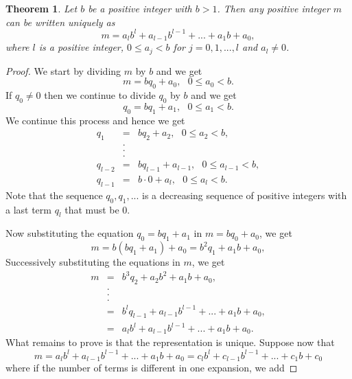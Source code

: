 \documentclass[12pt,letterpaper]{book}
\newtheorem{theorem}{Theorem}
\begin{document}
\begin{theorem} \label{base}
Let $b$ be a positive integer with $b>1$.  Then any positive integer
$m$ can be written uniquely as
\begin{equation*}
m=a_lb^l+a_{l-1}b^{l-1}+...+a_1b+a_0,
\end{equation*}
where $l$ is a positive integer, $0\leq a_j<b$ for $j=0,1,...,l$ and
$a_l\neq 0$.
\end{theorem}
\begin{proof}
We start by dividing $m$ by $b$ and we get
\begin{equation*}
m=bq_0+a_0, \ \ \ 0\leq a_0 <b.
\end{equation*}
If $q_0\neq 0$ then we continue to divide $q_0$ by $b$ and we get
\begin{equation*}
q_0=bq_1+a_1, \ \ \ 0\leq a_1<b.
\end{equation*}
We continue this process and hence we get
\begin{eqnarray*}
q_1&=&bq_2+a_2, \ \ \  0\leq a_2<b,\\
&.&\\
&.&\\
&.&\\
q_{l-2}&=&bq_{l-1}+a_{l-1}, \ \ \ 0\leq a_{l-1}<b,\\
q_{l-1}&=&b\cdot 0+a_l, \ \ \ 0\leq a_l<b.
\end{eqnarray*}
Note that the sequence $q_0,q_1,...$ is a decreasing sequence of
positive integers with a last term $q_l$ that must be 0.
\par Now substituting the equation $q_0=bq_1+a_1$ in $m=bq_0+a_0$, we get
\begin{equation*}
m=b(bq_1+a_1)+a_0=b^2q_1+a_1b+a_0,
\end{equation*}
Successively substituting the equations in $m$, we get
\begin{eqnarray*}
m&=&b^3q_2+a_2b^2+a_1b+a_0,\\
&.&\\
&.&\\
&.&\\
&=&b^lq_{l-1}+a_{l-1}b^{l-1}+...+a_1b+a_0,\\
&=& a_lb^l+a_{l-1}b^{l-1}+...+a_1b+a_0.
\end{eqnarray*}
What remains to prove is that the representation is unique. Suppose
now that
\begin{equation*}
m=a_lb^l+a_{l-1}b^{l-1}+...+a_1b+a_0=c_lb^l+c_{l-1}b^{l-1}+...+c_1b+c_0
\end{equation*}
where if the number of terms is different in one expansion, we add

\end{proof}
\end{document}
